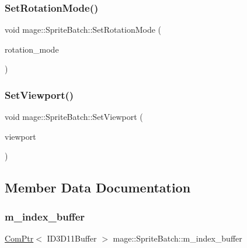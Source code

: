 \hypertarget{classmage_1_1_sprite_batch_a61ab7462374d9190220629be7827ba4b}{}\label{classmage_1_1_sprite_batch_a61ab7462374d9190220629be7827ba4b} 
\subsubsection{\texorpdfstring{Set\+Rotation\+Mode()}{SetRotationMode()}}
{\footnotesize\ttfamily void mage\+::\+Sprite\+Batch\+::\+Set\+Rotation\+Mode (\begin{DoxyParamCaption}\item[{D\+X\+G\+I\+\_\+\+M\+O\+D\+E\+\_\+\+R\+O\+T\+A\+T\+I\+ON}]{rotation\+\_\+mode }\end{DoxyParamCaption})}

\hypertarget{classmage_1_1_sprite_batch_aab9eab10e3ea1c62b483a67a47d9ccdc}{}\label{classmage_1_1_sprite_batch_aab9eab10e3ea1c62b483a67a47d9ccdc} 
\subsubsection{\texorpdfstring{Set\+Viewport()}{SetViewport()}}
{\footnotesize\ttfamily void mage\+::\+Sprite\+Batch\+::\+Set\+Viewport (\begin{DoxyParamCaption}\item[{const D3\+D11\+\_\+\+V\+I\+E\+W\+P\+O\+RT \&}]{viewport }\end{DoxyParamCaption})}



\subsection{Member Data Documentation}
\hypertarget{classmage_1_1_sprite_batch_a3e0cfc2be21a137712b3670238aa91fa}{}\label{classmage_1_1_sprite_batch_a3e0cfc2be21a137712b3670238aa91fa} 
\subsubsection{\texorpdfstring{m\+\_\+index\+\_\+buffer}{m\_index\_buffer}}
{\footnotesize\ttfamily \hyperlink{namespacemage_ae74f374780900893caa5555d1031fd79}{Com\+Ptr}$<$ I\+D3\+D11\+Buffer $>$ mage\+::\+Sprite\+Batch\+::m\+\_\+index\+\_\+buffer\hspace{0.3cm}{\ttfamily [private]}}

